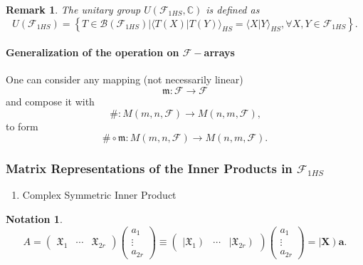 \documentclass[aps, preprint]{revtex4}
\newtheorem{notation}[theorem]{Notation}
\newtheorem{remark}[theorem]{Remark}
\begin{document}
\begin{remark}
The unitary group $U \left (\mathcal{F}_{1 H S} ,\mathbb{C}\right )$ is defined as
\begin{equation}U \left (\mathcal{F}_{1 H S}\right ) =\left \{\left .T \in \mathcal{B} \left (\mathcal{F}_{1 H S}\right )\right \vert  \langle \left .T \left (X\right )\right \vert T \left (Y\right ) \rangle _{H S} = \langle \left .X\right \vert Y \rangle _{H S} , \forall X ,Y \in \mathcal{F}_{1 H S}\right \}\text{.}
\end{equation}
\end{remark}

\paragraph{Generalization of the operation on $\mathcal{F} -$arrays}
One can consider any mapping (not necessarily linear)
\begin{equation}\mathfrak{m} :\mathcal{F} \rightarrow \mathcal{F}
\end{equation}and compose it with
\begin{equation}\# :M \left (m ,n ,\mathcal{F}\right ) \rightarrow M \left (n ,m ,\mathcal{F}\right )\text{,}
\end{equation}to form
\begin{equation}\# \circ \mathfrak{m} :M \left (m ,n ,\mathcal{F}\right ) \rightarrow M \left (n ,m ,\mathcal{F}\right )\text{.}
\end{equation}

\subsubsection{Matrix Representations of the Inner Products in $\mathcal{F}_{1 H S}$}
\begin{enumerate}
\item Complex Symmetric Inner Product \end{enumerate}



\begin{notation}
\begin{equation}A =\left (\begin{array}{ccc}\mathfrak{X}_{1} & \cdots  & \mathfrak{X}_{2 r}\end{array}\right ) \left (\begin{array}{c}a_{1} \\
\vdots  \\
a_{2 r}\end{array}\right ) \equiv \left (\begin{array}{ccc}\left \vert \mathfrak{X}_{1}\right ) & \cdots  & \left \vert \mathfrak{X}_{2 r}\right )\end{array}\right ) \left (\begin{array}{c}a_{1} \\
\vdots  \\
a_{2 r}\end{array}\right ) =\left \vert \mathbf{X}\right )\mathbf{a}\text{.}
\end{equation}
\end{notation}
\end{document}
